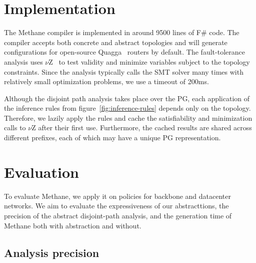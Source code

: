 \documentclass[numbers, 10pt, preprint]{sigplanconf}
\newcommand{\sysname}{{\small \sf Methane}\xspace}
\begin{document}
%
%
%
%

\section{Implementation}
\label{sec:implementation}

The \sysname compiler is implemented in around 9500 lines of F\# code. The compiler accepts both concrete and abstract topologies and will generate configurations for open-source Quagga~\cite{quagga} routers by default. The fault-tolerance analysis uses $\nu$Z~\cite{z3opt} to test validity and minimize variables subject to the topology constraints. Since the analysis typically calls the SMT solver many times with relatively small optimization problems, we use a timeout of 200ms.

Although the disjoint path analysis takes place over the PG, each application of the inference rules from figure~\ref{fig:inference-rules} depends only on the topology. Therefore, we lazily apply the rules and cache the satisfiability and minimization calls to $\nu$Z after their first use. Furthermore, the cached results are shared across different prefixes, each of which may have a unique PG representation.

\section{Evaluation}
\label{sec:evaluation}

To evaluate \sysname, we apply it on policies for backbone and datacenter networks. We aim to evaluate the expressiveness of our abstracttions, the precision of the abstract disjoint-path analysis, and the generation time of \sysname both with abstraction and without.

\subsection{Analysis precision}
\end{document}
